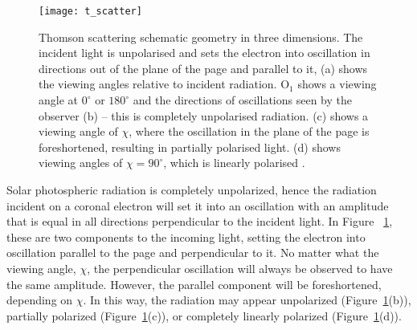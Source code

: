 \begin{figure}[!t]
\begin{center}
\texttt{[image: t\_scatter]}
\caption[Thomson scattering schematic.]{Thomson scattering schematic geometry in three dimensions. The incident light is unpolarised and sets the electron into oscillation in directions out of the plane of the page and parallel to it, (a) shows the viewing angles relative to incident radiation. O$_1$ shows a viewing angle at $0^{\circ}$ or $180^{\circ}$ and the directions of oscillations seen by the observer (b) -- this is completely unpolarised radiation. (c) shows a viewing angle of $\chi$, where the oscillation in the plane of the page is foreshortened, resulting in partially polarised light. (d) shows viewing angles of $\chi=90^{\circ}$, which is linearly polarised \citep{howtap2009}.}
\label{fig:tscatter}
\end{center}
\end{figure}
Solar photospheric radiation is completely unpolarized, hence the radiation incident on a coronal electron will set it into an oscillation with an amplitude that is equal in all directions perpendicular to the incident light. In Figure ~\ref{fig:tscatter}, these are two components to the incoming light, setting the electron into oscillation parallel to the page and perpendicular to it. No matter what the viewing angle, $\chi$, the perpendicular oscillation will always be observed to have the same amplitude. However, the parallel component will be foreshortened, depending on $\chi$. In this way, the radiation may appear unpolarized (Figure~\ref{fig:tscatter}(b)), partially polarized (Figure~\ref{fig:tscatter}(c)), or completely linearly polarized (Figure~\ref{fig:tscatter}(d)).

